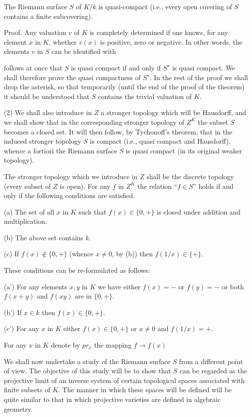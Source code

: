 The Riemann surface $S$ of $K/k$ is quasi-compact (i.e., every open covering of $S$ contains a finite subcovering).

Proof. Any valuation $v$ of $K$ is completely determined if one knows, for any element $x$ in $K$, whether $v(x)$ is positive, zero or negative. In other words, the elements $v$ in $S$ can be identified with

follows at once that $S$ is quasi compact if and only if $S^\star$ is quasi compact. We shall therefore prove the quasi compactness of $S^\star$. In the rest of the proof we shall drop the asterisk, so that temporarily (until the end of the proof of the theorem) it should be understood that $S$ contains the trivial valuation of $K$.

(2) We shall also introduce in $Z$ a stronger topology which will be Hausdorff, and we shall show that in the corresponding stronger topology of $Z^K$ the subset $S$ becomes a closed set. It will then follow, by Tychonoff’s theorem, that in the induced stronger topology $S$ is compact (i.e., quasi compact and Hausdorff), whence a fortiori the Riemann surface $S$ is quasi compact (in its original weaker topology).

The stronger topology which we introduce in $Z$ shall be the discrete topology (every subset of $Z$ is open). For any $f$ in $Z^K$ the relation “$f \in S$” holds if and only if the following conditions are satisfied.

(a) The set of all $x$ in $K$ such that $f(x) \in \{0, +\}$ is closed under addition and multiplication.

(b) The above set contains $k$.

(c) If $f(x) \notin \{0, +\}$ (whence $x \neq 0$, by (b)) then $f(1/x) \in \{+\}$.

These conditions can be re-formulated as follows:

(a') For any elements $x, y$ in $K$ we have either $f(x) = -$ or $f(y) = -$ or both $f(x+y)$ and $f(xy)$ are in $\{0, +\}$.

(b') If $x \in k$ then $f(x) \in \{0, +\}$.

(c') For any $x$ in $K$ either $f(x) \in \{0, +\}$ or $x \neq 0$ and $f(1/x) = +$.

For any $x$ in $K$ denote by $pr_x$ the mapping $f \rightarrow f(x)$

We shall now undertake a study of the Riemann surface $S$ from a different point of view. The objective of this study will be to show that $S$ can be regarded as the projective limit of an inverse system of certain topological spaces associated with finite subsets of $K$. The manner in which these spaces will be defined will be quite similar to that in which projective varieties are defined in algebraic geometry.

